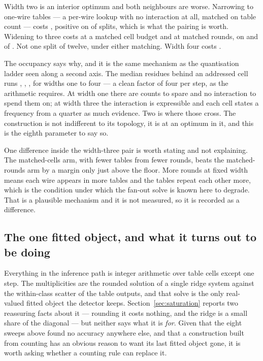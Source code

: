\documentclass[11pt]{article}
\begin{document}
Width two is an interior optimum and both neighbours are worse. Narrowing to
one-wire tables --- a per-wire lookup with no interaction at all, matched on table
count --- costs \WidthOneTables{}, positive on \WidthOneTablesSplits{} of
\LadderSplits{} splits, which is what the pairing is worth. Widening to three
costs \WidthThreeCells{} at a matched cell budget and \WidthThreeRounds{} at
matched rounds, on \WidthThreeCellsSplits{} and \WidthThreeRoundsSplits{} of
\LadderSplits{}. Not one split of twelve, under either matching. Width four costs
\WidthFourCells{}.

The occupancy says why, and it is the same mechanism as the quantisation ladder
seen along a second axis. The median residues behind an addressed cell runs
\WidthOneTablesCells{}, \WidthTwoCells{}, \WidthThreeRoundsCells{},
\WidthFourCellsCells{} for widths one to four --- a clean factor of four per step,
as the arithmetic requires. At width one there are counts to spare and no
interaction to spend them on; at width three the interaction is expressible and
each cell states a frequency from a quarter as much evidence. Two is where those
cross. The construction is not indifferent to its topology, it is at an optimum in
it, and this is the eighth parameter to say so.

One difference inside the width-three pair is worth stating and not explaining.
The matched-cells arm, with fewer tables from fewer rounds, beats the
matched-rounds arm by a margin only just above the \SatReseed{} floor. More rounds
at fixed width means each wire appears in more tables and the tables repeat each
other more, which is the condition under which the fan-out solve is known here to
degrade. That is a plausible mechanism and it is not measured, so it is recorded
as a difference.

\subsection{The one fitted object, and what it turns out to be doing}
\label{sec:decorrelation}
Everything in the inference path is integer arithmetic over table cells except one
step. The multiplicities are the rounded solution of a single ridge system against
the within-class scatter of the table outputs, and that solve is the only
real-valued fitted object the detector keeps. Section~\ref{sec:saturation} reports
two reassuring facts about it --- rounding it costs nothing, and the ridge is a
small share of the diagonal --- but neither says what it is \emph{for}. Given that
the eight sweeps above found no accuracy anywhere else, and that a construction
built from counting has an obvious reason to want its last fitted object gone, it
is worth asking whether a counting rule can replace it.
\end{document}
